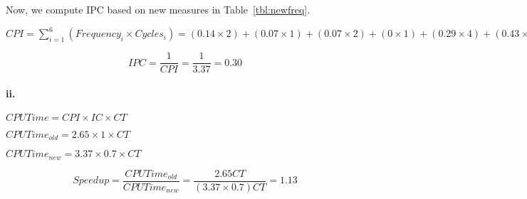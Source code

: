 \documentclass[12pt]{article}
\renewcommand{\part}[1]{\paragraph*{{#1}.}}
\begin{document}
Now, we compute IPC based on new measures in Table~\ref{tbl:newfreq}.

$
CPI = \sum \limits_{i=1}^{6} (Frequency_i \times Cycles_i) = 
(0.14 \times 2) + (0.07 \times 1) + (0.07 \times 2) + (0 \times 1) + 
(0.29 \times 4) + (0.43 \times 4) = 3.37
$

$$
IPC = \frac{1}{CPI} = \frac{1}{3.37} = 0.30
$$

\part{ii} 
$CPUTime = CPI \times IC \times CT$

$CPUTime_{old} = 2.65 \times 1 \times CT$

$CPUTime_{new} = 3.37 \times 0.7 \times CT$

\[
Speedup = \frac{CPUTime_{old}}{CPUTime_{new}} = \frac{2.65 CT}{(3.37 
\times 0.7) CT} = 1.13
\]
\end{document}
